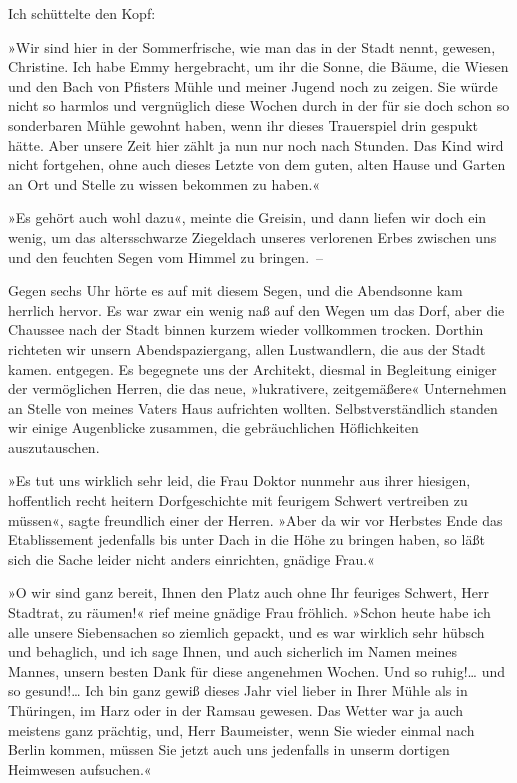 Ich schüttelte den Kopf:

»Wir sind hier in der Sommerfrische, wie man das in der Stadt
nennt, gewesen, Christine. Ich habe Emmy hergebracht, um ihr die
Sonne, die Bäume, die Wiesen und den Bach von Pfisters Mühle und
meiner Jugend noch zu zeigen. Sie würde nicht so harmlos und
vergnüglich diese Wochen durch in der für sie doch schon so
sonderbaren Mühle gewohnt haben, wenn ihr dieses Trauerspiel drin
gespukt hätte. Aber unsere Zeit hier zählt ja nun nur noch nach
Stunden. Das Kind wird nicht fortgehen, ohne auch dieses Letzte von
dem guten, alten Hause und Garten an Ort und Stelle zu wissen
bekommen zu haben.«

»Es gehört auch wohl dazu«, meinte die Greisin, und dann liefen wir
doch ein wenig, um das altersschwarze Ziegeldach unseres verlorenen
Erbes zwischen uns und den feuchten Segen vom Himmel zu bringen.~–

Gegen sechs Uhr hörte es auf mit diesem Segen, und die Abendsonne
kam herrlich hervor. Es war zwar ein wenig naß auf den Wegen um das
Dorf, aber die Chaussee nach der Stadt binnen kurzem wieder
vollkommen trocken. Dorthin richteten wir unsern Abendspaziergang,
allen Lustwandlern, die aus der Stadt kamen. entgegen. Es begegnete
uns der Architekt, diesmal in Begleitung einiger der vermöglichen
Herren, die das neue, »lukrativere, zeitgemäßere« Unternehmen an
Stelle von meines Vaters Haus aufrichten wollten.
Selbstverständlich standen wir einige Augenblicke zusammen, die
gebräuchlichen Höflichkeiten auszutauschen.

»Es tut uns wirklich sehr leid, die Frau Doktor nunmehr aus ihrer
hiesigen, hoffentlich recht heitern Dorfgeschichte mit feurigem
Schwert vertreiben zu müssen«, sagte freundlich einer der Herren.
»Aber da wir vor Herbstes Ende das Etablissement jedenfalls bis
unter Dach in die Höhe zu bringen haben, so läßt sich die Sache
leider nicht anders einrichten, gnädige Frau.«

»O wir sind ganz bereit, Ihnen den Platz auch ohne Ihr feuriges
Schwert, Herr Stadtrat, zu räumen!« rief meine gnädige Frau
fröhlich. »Schon heute habe ich alle unsere Siebensachen so
ziemlich gepackt, und es war wirklich sehr hübsch und behaglich,
und ich sage Ihnen, und auch sicherlich im Namen meines Mannes,
unsern besten Dank für diese angenehmen Wochen. Und so ruhig!\ldots{}
und so gesund!\ldots{} Ich bin ganz gewiß dieses Jahr viel lieber in
Ihrer Mühle als in Thüringen, im Harz oder in der Ramsau gewesen.
Das Wetter war ja auch meistens ganz prächtig, und, Herr
Baumeister, wenn Sie wieder einmal nach Berlin kommen, müssen Sie
jetzt auch uns jedenfalls in unserm dortigen Heimwesen aufsuchen.«

